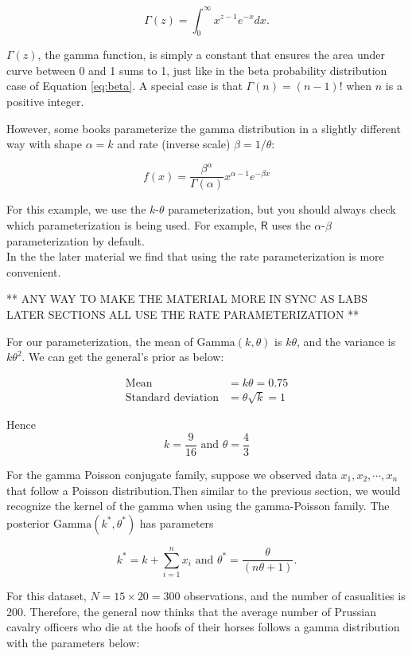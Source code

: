 \documentclass[]{book}
\theoremstyle{definition}
\theoremstyle{definition}
\theoremstyle{definition}
\theoremstyle{remark}
\begin{document}
\[\Gamma(z) = \int^{\infty}_0 x^{z-1} e^{-x} dx.\]

\(\Gamma(z)\), the gamma function, is simply a constant that ensures the
area under curve between 0 and 1 sums to 1, just like in the beta
probability distribution case of Equation \eqref{eq:beta}. A special case
is that \(\Gamma(n) = (n-1)!\) when \(n\) is a positive integer.

However, some books parameterize the gamma distribution in a slightly
different way with shape \(\alpha = k\) and rate (inverse scale)
\(\beta=1/\theta\):

\[f(x) = \frac{\beta^{\alpha}}{\Gamma(\alpha)} x^{\alpha-1} e^{-\beta x}\]

For this example, we use the \(k\)-\(\theta\) parameterization, but you
should always check which parameterization is being used. For example,
\(\mathsf{R}\) uses the \(\alpha\)-\(\beta\) parameterization by
default.\\
In the the later material we find that using the rate parameterization
is more convenient.

** ANY WAY TO MAKE THE MATERIAL MORE IN SYNC AS LABS LATER SECTIONS ALL
USE THE RATE PARAMETERIZATION **

For our parameterization, the mean of \(\text{Gamma}(k,\theta)\) is
\(k\theta\), and the variance is \(k\theta^2\). We can get the general's
prior as below:

\[\begin{aligned}
\text{Mean} &= k\theta = 0.75 \\
\text{Standard deviation} &= \theta\sqrt{k} = 1
\end{aligned}\]

Hence \[k = \frac{9}{16} \text{ and } \theta = \frac{4}{3}\]

For the gamma Poisson conjugate family, suppose we observed data
\(x_1, x_2, \cdots, x_n\) that follow a Poisson distribution.Then
similar to the previous section, we would recognize the kernel of the
gamma when using the gamma-Poisson family. The posterior
\(\text{Gamma}(k^*, \theta^*)\) has parameters

\[k^* = k + \sum^n_{i=1} x_i \text{ and } \theta^* = \frac{\theta}{(n\theta+1)}.\]

For this dataset, \(N = 15 \times 20 = 300\) observations, and the
number of casualities is 200. Therefore, the general now thinks that the
average number of Prussian cavalry officers who die at the hoofs of
their horses follows a gamma distribution with the parameters below:
\end{document}
